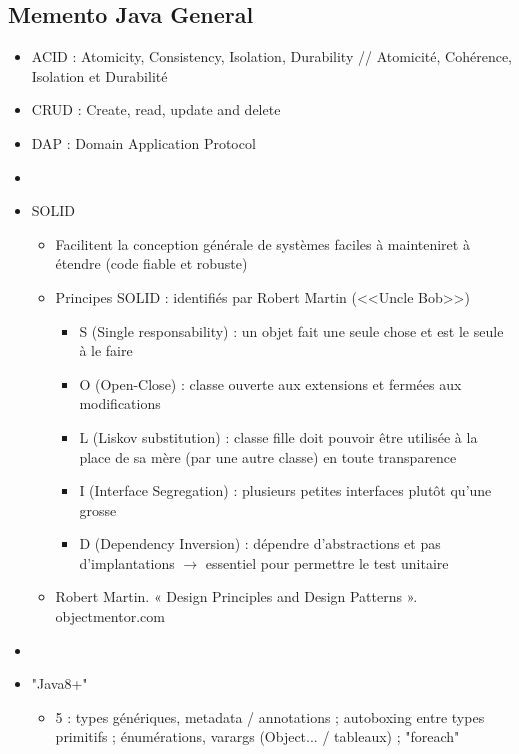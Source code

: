 \documentclass[11pt,twoside,a4paper]{article}
\begin{document}
\begin{landscape}


\begin{multicols}{2}
	\section*{Memento Java General}
	
	\begin{itemize}
		\item ACID : Atomicity, Consistency, Isolation, Durability // Atomicit{\'e}, Coh{\'e}rence, Isolation et Durabilit{\'e}
		\item CRUD : Create, read, update and delete
		\item DAP : Domain Application Protocol 
		\item[] 
		\item SOLID
		\begin{itemize}
			\item[] Facilitent la conception g{\'e}n{\'e}rale de syst{\`e}mes faciles {\`a} mainteniret {\`a} {\'e}tendre (code fiable et robuste)
			\item[] Principes SOLID : identifi{\'e}s par Robert Martin (<<Uncle Bob>>)
			\begin{itemize}
				\item S (Single responsability) : un objet fait une seule chose et est le seule {\`a} le faire
				\item O (Open-Close) : classe ouverte aux extensions et ferm{\'e}es aux modifications
				\item L (Liskov substitution) : classe fille doit pouvoir {\^e}tre utilis{\'e}e {\`a} la place de sa m{\`e}re (par une autre classe) en toute transparence
				\item I (Interface Segregation) : plusieurs petites interfaces plut{\^o}t qu'une grosse
				\item D (Dependency Inversion) : d{\'e}pendre d'abstractions et pas d'implantations $\rightarrow$ essentiel pour permettre le test unitaire
			\end{itemize}
			\item[] Robert Martin. « Design Principles and Design Patterns ». objectmentor.com
		\end{itemize}
		\item[] 
		\item "Java8+"
			\begin{itemize}
				\item 5 : types g{\'e}n{\'e}riques, metadata / annotations ; autoboxing entre types primitifs ; {\'e}num{\'e}rations, varargs (Object... / tableaux) ; "foreach"

\end{itemize}
\end{itemize}
\end{multicols}
\end{landscape}
\end{document}
